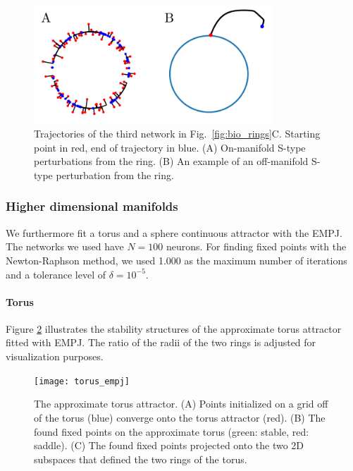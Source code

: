 \documentclass{article} %
\newcounter{ct}
\theoremstyle{definition}
\theoremstyle{remark}
\begin{document}
\begin{figure}[h]
\centering
\includegraphics[width=0.8\textwidth]{empj_onoff_perturbation}
\caption{Trajectories of the third network in Fig.~\ref{fig:bio_rings}C. Starting point in red, end of trajectory in blue.
(A) On-manifold S-type perturbations from the ring.
(B) An example of an off-manifold  S-type perturbation from the ring.
}\label{fig:empj_onoff_perturbation}
\end{figure}




\subsubsection{Higher dimensional manifolds}
We furthermore fit a torus and a sphere continuous attractor with the EMPJ.
The networks we used have \(N = 100\) neurons.
For finding fixed points with the Newton-Raphson method, we used 1.000  as the maximum number of iterations  and a tolerance level of \(\delta = 10^{-5}\).

\paragraph{Torus}
Figure \ref{fig:torus_empj} illustrates the stability structures of  the approximate torus attractor fitted with EMPJ.
The ratio of the radii of the two rings is adjusted for visualization purposes.
\begin{figure}[h]
\centering
\texttt{[image: torus\_empj]}
\caption{The approximate torus attractor.
(A) Points initialized on a grid off of the torus (blue) converge onto the torus attractor (red).
(B) The found fixed points on the approximate torus (green: stable, red: saddle).
(C) The found fixed points projected onto the two 2D subspaces that defined the two rings of the torus.
}\label{fig:torus_empj}
\end{figure}
\end{document}
